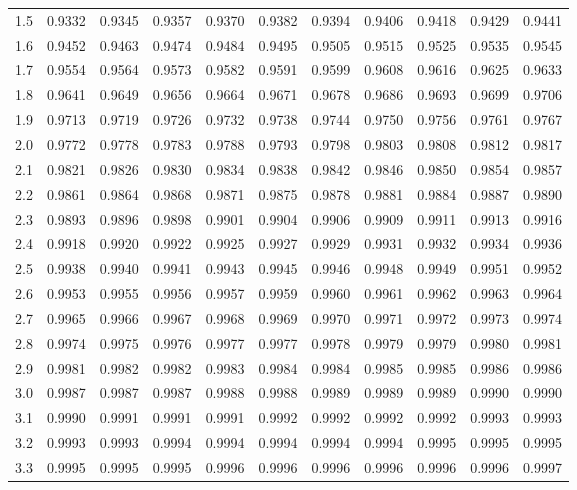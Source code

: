 {\begin{tabularx}{\textwidth}{p{0.5cm}ZZZZZZZZZZ}
1.5& 0.9332& 0.9345& 0.9357& 0.9370& 0.9382& 0.9394& 0.9406& 0.9418& 0.9429& 0.9441\\ 
1.6& 0.9452& 0.9463& 0.9474& 0.9484& 0.9495& 0.9505& 0.9515& 0.9525& 0.9535& 0.9545\\ 
1.7& 0.9554& 0.9564& 0.9573& 0.9582& 0.9591& 0.9599& 0.9608& 0.9616& 0.9625& 0.9633\\ 
1.8& 0.9641& 0.9649& 0.9656& 0.9664& 0.9671& 0.9678& 0.9686& 0.9693& 0.9699& 0.9706\\ 
1.9& 0.9713& 0.9719& 0.9726& 0.9732& 0.9738& 0.9744& 0.9750& 0.9756& 0.9761& 0.9767\\ 
2.0& 0.9772& 0.9778& 0.9783& 0.9788& 0.9793& 0.9798& 0.9803& 0.9808& 0.9812& 0.9817\\ 
2.1& 0.9821& 0.9826& 0.9830& 0.9834& 0.9838& 0.9842& 0.9846& 0.9850& 0.9854& 0.9857\\ 
2.2& 0.9861& 0.9864& 0.9868& 0.9871& 0.9875& 0.9878& 0.9881& 0.9884& 0.9887& 0.9890\\ 
2.3& 0.9893& 0.9896& 0.9898& 0.9901& 0.9904& 0.9906& 0.9909& 0.9911& 0.9913& 0.9916\\ 
2.4& 0.9918& 0.9920& 0.9922& 0.9925& 0.9927& 0.9929& 0.9931& 0.9932& 0.9934& 0.9936\\ 
2.5& 0.9938& 0.9940& 0.9941& 0.9943& 0.9945& 0.9946& 0.9948& 0.9949& 0.9951& 0.9952\\ 
2.6& 0.9953& 0.9955& 0.9956& 0.9957& 0.9959& 0.9960& 0.9961& 0.9962& 0.9963& 0.9964\\ 
2.7& 0.9965& 0.9966& 0.9967& 0.9968& 0.9969& 0.9970& 0.9971& 0.9972& 0.9973& 0.9974\\ 
2.8& 0.9974& 0.9975& 0.9976& 0.9977& 0.9977& 0.9978& 0.9979& 0.9979& 0.9980& 0.9981\\ 
2.9& 0.9981& 0.9982& 0.9982& 0.9983& 0.9984& 0.9984& 0.9985& 0.9985& 0.9986& 0.9986\\ 
3.0& 0.9987& 0.9987& 0.9987& 0.9988& 0.9988& 0.9989& 0.9989& 0.9989& 0.9990& 0.9990\\ 
3.1& 0.9990& 0.9991& 0.9991& 0.9991& 0.9992& 0.9992& 0.9992& 0.9992& 0.9993& 0.9993\\ 
3.2& 0.9993& 0.9993& 0.9994& 0.9994& 0.9994& 0.9994& 0.9994& 0.9995& 0.9995& 0.9995\\ 
3.3& 0.9995& 0.9995& 0.9995& 0.9996& 0.9996& 0.9996& 0.9996& 0.9996& 0.9996& 0.9997\\ 
\end{tabularx}
}
\endgroup
